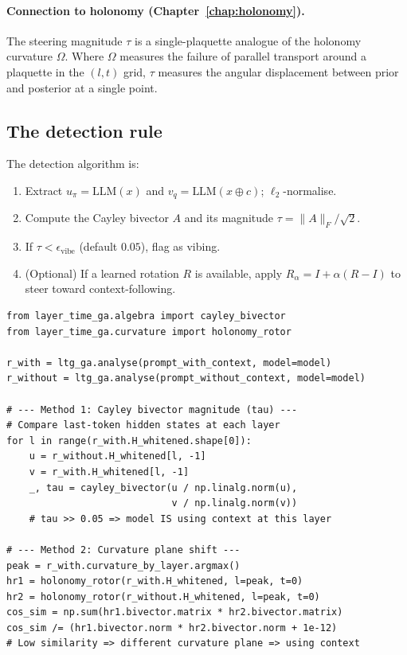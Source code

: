 \documentclass[11pt, twoside, openright]{memoir}
\numberwithin{equation}{chapter}
\begin{document}
\paragraph{Connection to holonomy (Chapter~\ref{chap:holonomy}).}
The steering magnitude $\tau$ is a single-plaquette analogue of the
holonomy curvature $\Omega$.  Where $\Omega$ measures the failure of
parallel transport around a plaquette in the $(l, t)$ grid, $\tau$
measures the angular displacement between prior and posterior at a
single point.

\subsection{The detection rule}

The detection algorithm is:
\begin{enumerate}[nosep]
\item Extract $u_\pi = \text{LLM}(x)$ and
  $v_q = \text{LLM}(x \oplus c)$; $\ell_2$-normalise.
\item Compute the Cayley bivector $A$ and its magnitude
  $\tau = \|A\|_F / \sqrt{2}$.
\item If $\tau < \epsilon_{\text{vibe}}$ (default $0.05$),
  flag as vibing.
\item (Optional) If a learned rotation $R$ is available, apply
  $R_\alpha = I + \alpha(R - I)$ to steer toward context-following.
\end{enumerate}

\begin{lstlisting}[caption={Context detection via Cayley bivector and curvature plane shift}]
from layer_time_ga.algebra import cayley_bivector
from layer_time_ga.curvature import holonomy_rotor

r_with = ltg_ga.analyse(prompt_with_context, model=model)
r_without = ltg_ga.analyse(prompt_without_context, model=model)

# --- Method 1: Cayley bivector magnitude (tau) ---
# Compare last-token hidden states at each layer
for l in range(r_with.H_whitened.shape[0]):
    u = r_without.H_whitened[l, -1]
    v = r_with.H_whitened[l, -1]
    _, tau = cayley_bivector(u / np.linalg.norm(u),
                             v / np.linalg.norm(v))
    # tau >> 0.05 => model IS using context at this layer

# --- Method 2: Curvature plane shift ---
peak = r_with.curvature_by_layer.argmax()
hr1 = holonomy_rotor(r_with.H_whitened, l=peak, t=0)
hr2 = holonomy_rotor(r_without.H_whitened, l=peak, t=0)
cos_sim = np.sum(hr1.bivector.matrix * hr2.bivector.matrix)
cos_sim /= (hr1.bivector.norm * hr2.bivector.norm + 1e-12)
# Low similarity => different curvature plane => using context
\end{lstlisting}
\end{document}
